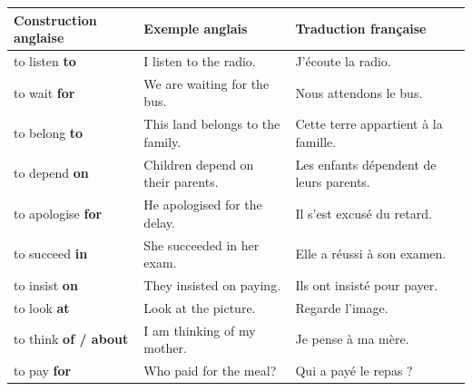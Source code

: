\documentclass[11pt]{article}
\begin{document}
\begin{center}
\begin{tabularx}{\linewidth}{|X|X|X|}
\hline
\rowcolor{popblueL} Construction anglaise & Exemple anglais & Traduction française \\
\hline
to listen \textbf{to} & I listen to the radio. & J'écoute la radio. \\
\hline
to wait \textbf{for} & We are waiting for the bus. & Nous attendons le bus. \\
\hline
to belong \textbf{to} & This land belongs to the family. & Cette terre appartient à la famille. \\
\hline
to depend \textbf{on} & Children depend on their parents. & Les enfants dépendent de leurs parents. \\
\hline
to apologise \textbf{for} & He apologised for the delay. & Il s'est excusé du retard. \\
\hline
to succeed \textbf{in} & She succeeded in her exam. & Elle a réussi à son examen. \\
\hline
to insist \textbf{on} & They insisted on paying. & Ils ont insisté pour payer. \\
\hline
to look \textbf{at} & Look at the picture. & Regarde l'image. \\
\hline
to think \textbf{of / about} & I am thinking of my mother. & Je pense à ma mère. \\
\hline
to pay \textbf{for} & Who paid for the meal? & Qui a payé le repas ? \\
\hline
\end{tabularx}
\end{center}
\end{document}
